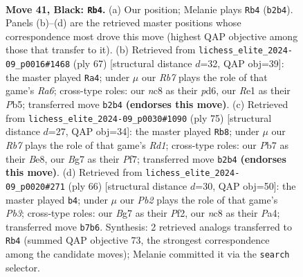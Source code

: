 \documentclass[11pt]{article}
\begin{document}
\clearpage

\begin{figure}[p]\centering
\begin{subfigure}{0.46\textwidth}\centering
\resizebox{\linewidth}{!}{%
\newchessgame
\chessboard[
  setfen={2N5/1p4bk/6p1/5p1p/P7/R5P1/1r3PKP/4r3 b - - 1 41},
  showmover=false,
  pgfstyle=straightmove, color=movearrow, markmove={b2-b4}
]}
\caption{}
\end{subfigure}\hfill
\begin{subfigure}{0.46\textwidth}\centering
\resizebox{\linewidth}{!}{%
\newchessgame
\chessboard[
  setfen={6k1/5pp1/p2P3p/1p2p3/4P3/r2P1R1P/6PK/8 b - - 0 34},
  showmover=false,
  pgfstyle=straightmove, color=movearrow, markmove={a3-a4}
]}
\caption{}
\end{subfigure}
\\[4pt]
\begin{subfigure}{0.46\textwidth}\centering
\resizebox{\linewidth}{!}{%
\newchessgame
\chessboard[
  setfen={3rb1k1/5pp1/7p/R2P4/3NP3/5P1P/6P1/6K1 b - - 0 38},
  showmover=false,
  pgfstyle=straightmove, color=movearrow, markmove={d8-b8}
]}
\caption{}
\end{subfigure}\hfill
\begin{subfigure}{0.46\textwidth}\centering
\resizebox{\linewidth}{!}{%
\newchessgame
\chessboard[
  setfen={8/1R3pk1/p2r2pp/8/P7/1P2K1P1/5P1P/8 w - - 1 34},
  showmover=false,
  pgfstyle=straightmove, color=movearrow, markmove={b3-b4}
]}
\caption{}
\end{subfigure}
\caption{\textbf{Move 41, Black: \texttt{Rb4}.} (a) Our position; Melanie plays \texttt{Rb4} (\texttt{b2b4}). Panels (b)--(d) are the retrieved master positions whose correspondence most drove this move (highest QAP objective among those that transfer to it). (b) Retrieved from \texttt{lichess\_elite\_2024-09\_p0016\#1468} (ply 67) [structural distance $d$=32, QAP obj=39]: the master played \texttt{Ra4}; under $\mu$ our \emph{Rb7} plays the role of that game's \emph{Ra6}; cross-type roles: our \emph{n}c8 as their \emph{p}d6, our \emph{R}e1 as their \emph{P}b5; transferred move \texttt{b2b4} \textbf{(endorses this move)}. (c) Retrieved from \texttt{lichess\_elite\_2024-09\_p0030\#1090} (ply 75) [structural distance $d$=27, QAP obj=34]: the master played \texttt{Rb8}; under $\mu$ our \emph{Rb7} plays the role of that game's \emph{Rd1}; cross-type roles: our \emph{P}b7 as their \emph{B}e8, our \emph{B}g7 as their \emph{P}f7; transferred move \texttt{b2b4} \textbf{(endorses this move)}. (d) Retrieved from \texttt{lichess\_elite\_2024-09\_p0020\#271} (ply 66) [structural distance $d$=30, QAP obj=50]: the master played \texttt{b4}; under $\mu$ our \emph{Pb2} plays the role of that game's \emph{Pb3}; cross-type roles: our \emph{B}g7 as their \emph{P}f2, our \emph{n}c8 as their \emph{P}a4; transferred move \texttt{b7b6}. Synthesis: 2 retrieved analogs transferred to \texttt{Rb4} (summed QAP objective 73, the strongest correspondence among the candidate moves); Melanie committed it via the \texttt{search} selector.}
\label{fig:thought-m81}
\end{figure}
\end{document}
